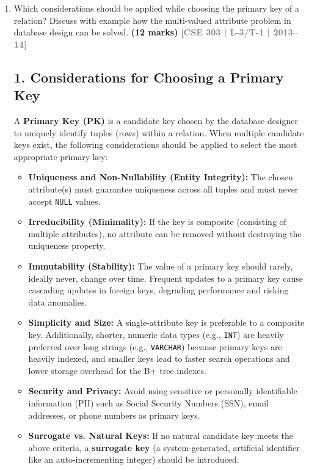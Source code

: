 \documentclass[12pt,a3paper]{article}
\newcommand{\yr}[1]{\hfill\textcolor{gray}{\small\textbf{[#1]}}}
\newcommand{\mk}[1]{\textcolor{orange!70!black}{\small\textbf{(#1 marks)}}}
\begin{document}
\begin{enumerate}
\item Which considerations should be applied while choosing the primary key of a relation? Discuss with example how the multi-valued attribute problem in database design can be solved.
\mk{12} \yr{CSE 303 | L-3/T-1 | 2013--14}

\begin{tcolorbox}[enhanced,breakable,ansbox,colback=cA!4,colframe=cA,boxrule=0.8pt,arc=5pt,title={\textbf{Answer}},fonttitle=\bfseries\color{white},colbacktitle=cA]

\subsection*{1. Considerations for Choosing a Primary Key}

A \textbf{Primary Key (PK)} is a candidate key chosen by the database designer to uniquely identify tuples (rows) within a relation. When multiple candidate keys exist, the following considerations should be applied to select the most appropriate primary key:

\begin{itemize}
    \item \textbf{Uniqueness and Non-Nullability (Entity Integrity):} The chosen attribute(s) must guarantee uniqueness across all tuples and must never accept \texttt{NULL} values.
    \item \textbf{Irreducibility (Minimality):} If the key is composite (consisting of multiple attributes), no attribute can be removed without destroying the uniqueness property.
    \item \textbf{Immutability (Stability):} The value of a primary key should rarely, ideally never, change over time. Frequent updates to a primary key cause cascading updates in foreign keys, degrading performance and risking data anomalies.
    \item \textbf{Simplicity and Size:} A single-attribute key is preferable to a composite key. Additionally, shorter, numeric data types (e.g., \texttt{INT}) are heavily preferred over long strings (e.g., \texttt{VARCHAR}) because primary keys are heavily indexed, and smaller keys lead to faster search operations and lower storage overhead for the B+ tree indexes.
    \item \textbf{Security and Privacy:} Avoid using sensitive or personally identifiable information (PII) such as Social Security Numbers (SSN), email addresses, or phone numbers as primary keys.
    \item \textbf{Surrogate vs. Natural Keys:} If no natural candidate key meets the above criteria, a \textbf{surrogate key} (a system-generated, artificial identifier like an auto-incrementing integer) should be introduced.
\end{itemize}


\end{tcolorbox}
\end{enumerate}
\end{document}
